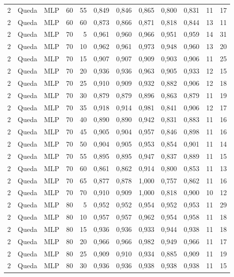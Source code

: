 \begin{longtable}{@{}rllrrrrrrrrr@{}}
2 & Queda & MLP & 60 & 55 & 0,849 & 0,846 & 0,865 & 0,800 & 0,831 & 11 & 17 \\
2 & Queda & MLP & 60 & 60 & 0,873 & 0,866 & 0,871 & 0,818 & 0,844 & 13 & 11 \\
2 & Queda & MLP & 70 & 5 & 0,961 & 0,960 & 0,966 & 0,951 & 0,959 & 14 & 31 \\
2 & Queda & MLP & 70 & 10 & 0,962 & 0,961 & 0,973 & 0,948 & 0,960 & 13 & 20 \\
2 & Queda & MLP & 70 & 15 & 0,907 & 0,907 & 0,909 & 0,903 & 0,906 & 11 & 25 \\
2 & Queda & MLP & 70 & 20 & 0,936 & 0,936 & 0,963 & 0,905 & 0,933 & 12 & 15 \\
2 & Queda & MLP & 70 & 25 & 0,910 & 0,909 & 0,932 & 0,882 & 0,906 & 12 & 18 \\
2 & Queda & MLP & 70 & 30 & 0,879 & 0,879 & 0,896 & 0,863 & 0,879 & 11 & 19 \\
2 & Queda & MLP & 70 & 35 & 0,918 & 0,914 & 0,981 & 0,841 & 0,906 & 12 & 17 \\
2 & Queda & MLP & 70 & 40 & 0,890 & 0,890 & 0,942 & 0,831 & 0,883 & 11 & 16 \\
2 & Queda & MLP & 70 & 45 & 0,905 & 0,904 & 0,957 & 0,846 & 0,898 & 11 & 16 \\
2 & Queda & MLP & 70 & 50 & 0,904 & 0,905 & 0,953 & 0,854 & 0,901 & 11 & 14 \\
2 & Queda & MLP & 70 & 55 & 0,895 & 0,895 & 0,947 & 0,837 & 0,889 & 11 & 15 \\
2 & Queda & MLP & 70 & 60 & 0,861 & 0,862 & 0,914 & 0,800 & 0,853 & 11 & 13 \\
2 & Queda & MLP & 70 & 65 & 0,877 & 0,878 & 1,000 & 0,757 & 0,862 & 11 & 16 \\
2 & Queda & MLP & 70 & 70 & 0,910 & 0,909 & 1,000 & 0,818 & 0,900 & 10 & 12 \\
2 & Queda & MLP & 80 & 5 & 0,952 & 0,952 & 0,954 & 0,952 & 0,953 & 11 & 29 \\
2 & Queda & MLP & 80 & 10 & 0,957 & 0,957 & 0,962 & 0,954 & 0,958 & 11 & 18 \\
2 & Queda & MLP & 80 & 15 & 0,936 & 0,936 & 0,933 & 0,944 & 0,938 & 11 & 18 \\
2 & Queda & MLP & 80 & 20 & 0,966 & 0,966 & 0,982 & 0,949 & 0,966 & 11 & 17 \\
2 & Queda & MLP & 80 & 25 & 0,909 & 0,910 & 0,934 & 0,885 & 0,909 & 11 & 19 \\
2 & Queda & MLP & 80 & 30 & 0,936 & 0,936 & 0,938 & 0,938 & 0,938 & 11 & 15 \\

\end{longtable}
